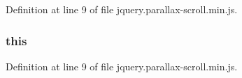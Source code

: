 Definition at line 9 of file jquery.\+parallax-\/scroll.\+min.\+js.

\subsubsection[{\texorpdfstring{this}{this}}]{\setlength{\rightskip}{0pt plus 5cm}this}\hypertarget{jquery_8parallax-scroll_8min_8js_a05c09a5e9d53fa7adf0a7936038c2fa3}{}\label{jquery_8parallax-scroll_8min_8js_a05c09a5e9d53fa7adf0a7936038c2fa3}


Definition at line 9 of file jquery.\+parallax-\/scroll.\+min.\+js.

